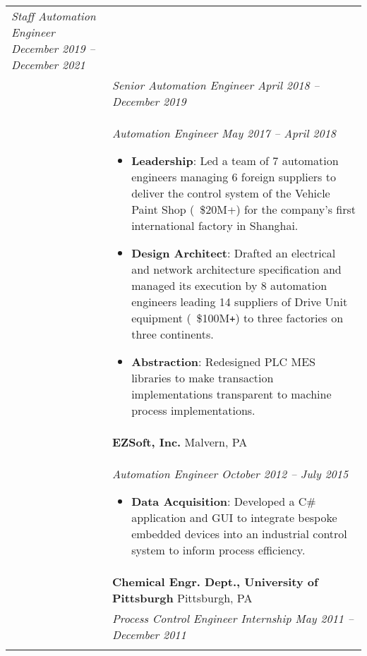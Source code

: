 \documentclass[11pt]{article}
\begin{document}
\begin{tabular}[t]{@{}p{1.05in} @{}p{6.00in}}
    \textit{Staff Automation Engineer \hfill December 2019 -- December 2021}
\\ &
 
    \textit{Senior Automation Engineer \hfill April 2018 -- December 2019}
\\ &
 
    \textit{Automation Engineer \hfill May 2017 -- April 2018}
        \begin{itemize}[noitemsep,topsep=0pt]
            \item \textbf{Leadership}: Led a team of 7 automation engineers managing 6 foreign suppliers to deliver the control system of the Vehicle Paint Shop (~\$20M+) for the company's first international factory in Shanghai.%
            \item \textbf{Design Architect}: Drafted an electrical and network architecture specification and managed its execution by 8 automation engineers leading 14 suppliers of Drive Unit equipment (~\$100M\verb!+!) to three factories on three continents.%
            \item \textbf{Abstraction}: Redesigned PLC MES libraries to make transaction implementations transparent to machine process implementations.%
        \end{itemize}
\\
&
\textbf{EZSoft, Inc.}  \hfill Malvern, PA \\ &
 
    \textit{Automation Engineer \hfill October 2012 -- July 2015}
        \begin{itemize}[noitemsep,topsep=0pt]
            \item \textbf{Data Acquisition}: Developed a C\# application and GUI to integrate bespoke embedded devices into an industrial control system to inform process efficiency.%
        \end{itemize}
\\
&
\textbf{Chemical Engr. Dept., University of Pittsburgh}  \hfill Pittsburgh, PA \\ &
 
    \textit{Process Control Engineer Internship \hfill May 2011 -- December 2011}
\\
\\


\end{tabular}
\end{document}

